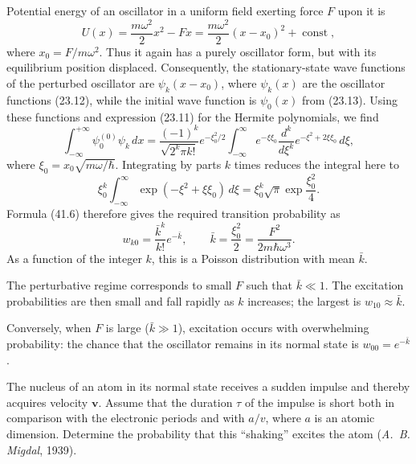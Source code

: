 \SolutionHeading Potential energy of an oscillator in a uniform field exerting
force $F$ upon it is
\[
  U(x)=\frac{m\omega^2}{2}x^2-Fx
  =\frac{m\omega^2}{2}(x-x_0)^2+\operatorname{const},
\]
where $x_0=F/m\omega^2$. Thus it again has a purely oscillator form, but with
its equilibrium position displaced. Consequently, the stationary-state wave
functions of the perturbed oscillator are $\psi_k(x-x_0)$, where $\psi_k(x)$
are the oscillator functions (23.12), while the initial wave function is
$\psi_0(x)$ from (23.13). Using these functions and expression (23.11) for the
Hermite polynomials, we find
\[
  \int_{-\infty}^{+\infty}\psi_0^{(0)}\psi_k\,dx
  =\frac{(-1)^k}{\sqrt{2^k\pi k!}}e^{-\xi_0^2/2}
   \int_{-\infty}^{\infty}e^{-\xi\xi_0}
   \frac{d^k}{d\xi^k}e^{-\xi^2+2\xi\xi_0}\,d\xi,
\]
where $\xi_0=x_0\sqrt{m\omega/\hbar}$. Integrating by parts $k$ times
reduces the integral here to
\[
  \xi_0^k\int_{-\infty}^{\infty}\exp(-\xi^2+\xi\xi_0)\,d\xi
  =\xi_0^k\sqrt\pi\exp\frac{\xi_0^2}{4}.
\]
Formula (41.6) therefore gives the required transition probability as
\[
  w_{k0}=\frac{\bar k^k}{k!}e^{-\bar k},\qquad
  \bar k=\frac{\xi_0^2}{2}=\frac{F^2}{2m\hbar\omega^3}.
\]
As a function of the integer $k$, this is a Poisson distribution with mean
$\bar k$.

The perturbative regime corresponds to small $F$ such that $\bar k\ll1$.
The excitation probabilities are then small and fall rapidly as $k$
increases; the largest is $w_{10}\approx\bar k$.

Conversely, when $F$ is large ($\bar k\gg1$), excitation occurs with
overwhelming probability: the chance that the oscillator remains in its
normal state is $w_{00}=e^{-\bar k}$.

 The nucleus of an atom in its normal state receives a
sudden impulse and thereby acquires velocity $\mathbf v$. Assume that the
duration $\tau$ of the impulse is short both in comparison with the electronic
periods and with $a/v$, where $a$ is an atomic dimension. Determine the
probability that this ``shaking'' excites the atom (\emph{A.~B. Migdal}, 1939).

